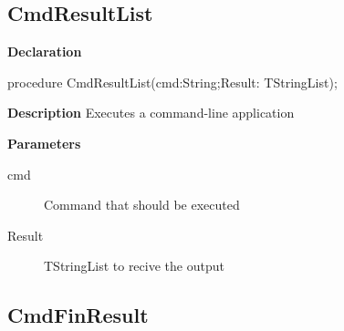 \documentclass{report}
\newif\ifpdf
\begin{document}
\subsection*{CmdResultList}
\fi
\label{utilities-CmdResultList}
\begin{list}{}{
\setlength{\itemindent}{0cm}
\setlength{\listparindent}{0cm}
\setlength{\leftmargin}{\evensidemargin}
\addtolength{\leftmargin}{\tmplength}
\settowidth{\labelsep}{X}
\addtolength{\leftmargin}{\labelsep}
\setlength{\labelwidth}{\tmplength}
}
\item[\textbf{Declaration}\hfill]
\ifpdf
\begin{flushleft}
\fi
\begin{ttfamily}
procedure CmdResultList(cmd:String;Result: TStringList);\end{ttfamily}

\ifpdf
\end{flushleft}
\fi

\par
\item[\textbf{Description}]
Executes a command{-}line application  \par
\item[\textbf{Parameters}]
\begin{description}
\item[cmd] Command that should be executed
\item[Result] TStringList to recive the output
\end{description}


\end{list}
\ifpdf
\subsection*{\large{\textbf{CmdFinResult}}\normalsize\hspace{1ex}\hrulefill}
\else
\end{document}
